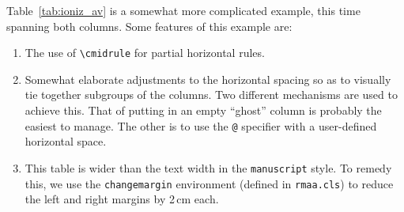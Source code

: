 \documentclass[debug]{rmaa}
\newcommand{\CS}[1]{\texttt{\textbackslash #1}}
\begin{document}
Table~\ref{tab:ioniz_av} is a somewhat more complicated example, this
time spanning both columns. Some features of this example are:
\begin{enumerate}
\item The use of \CS{cmidrule} for partial horizontal rules. 
\item Somewhat elaborate adjustments to the horizontal spacing so as
  to visually tie together subgroups of the columns. Two different
  mechanisms are used to achieve this. That of putting in an empty
  ``ghost'' column is probably the easiest to manage. The other is to
  use the \verb+@+ specifier with a user-defined horizontal space.
\item This table is wider than the text width in the
  \texttt{manuscript} style. To remedy this, we use the
  \texttt{changemargin} environment (defined in \texttt{rmaa.cls}) to
  reduce the left and right margins by 2\,cm each.
\end{enumerate}
\end{document}
